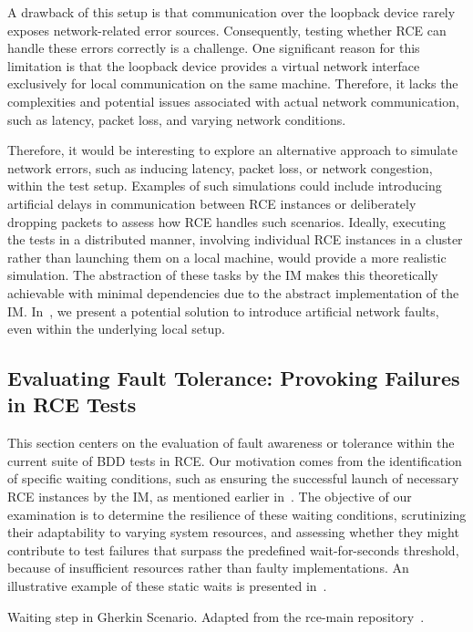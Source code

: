 A drawback of this setup is that communication over the loopback device rarely exposes network-related error sources. Consequently, testing whether RCE can handle these errors correctly is a challenge. One significant reason for this limitation is that the loopback device provides a virtual network interface exclusively for local communication on the same machine. Therefore, it lacks the complexities and potential issues associated with actual network communication, such as latency, packet loss, and varying network conditions.


Therefore, it would be interesting to explore an alternative approach to simulate network errors, such as inducing latency, packet loss, or network congestion, within the test setup. Examples of such simulations could include introducing artificial delays in communication between \ac{RCE} instances or deliberately dropping packets to assess how \ac{RCE} handles such scenarios. Ideally, executing the tests in a distributed manner, involving individual \ac{RCE} instances in a cluster rather than launching them on a local machine, would provide a more realistic simulation. The abstraction of these tasks by the \ac{IM} makes this theoretically achievable with minimal dependencies due to the abstract implementation of the \ac{IM}. In~, we present a potential solution to introduce artificial network faults, even within the underlying local setup.

\subsection{Evaluating Fault Tolerance: Provoking Failures in \ac{RCE} Tests}
\label{subsec:fault-tolerance}
This section centers on the evaluation of fault awareness or tolerance within the current suite of \ac{BDD} tests in \ac{RCE}. Our motivation comes from the identification of specific waiting conditions, such as ensuring the successful launch of necessary RCE instances by the \ac{IM}, as mentioned earlier in~. The objective of our examination is to determine the resilience of these waiting conditions, scrutinizing their adaptability to varying system resources, and assessing whether they might contribute to test failures that surpass the predefined wait-for-seconds threshold, because of insufficient resources rather than faulty implementations. An illustrative example of these static waits is presented in~.

\begin{listing}[!ht]
\caption{Waiting step in Gherkin Scenario. Adapted from the rce-main repository~\cite{githubGitHubRcenvironmentrcemain}.}
\label{lst:staticwait}
\inputminted[linenos, xleftmargin=2em]{gherkin}{files/code/staticwait.feature}
\end{listing}

